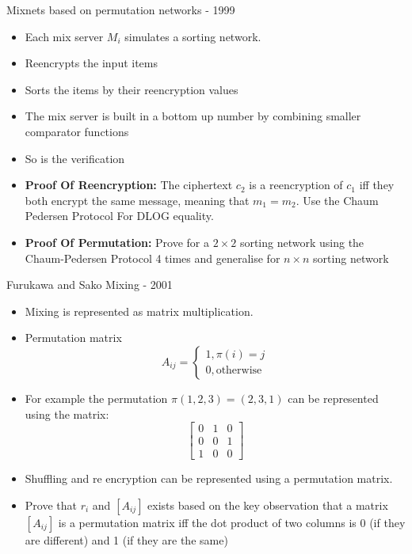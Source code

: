 \documentclass{beamer}
\begin{document}
\begin{frame}[allowframebreaks]{Mixnets based on permutation networks - 1999}
\begin{itemize}
\item Each mix server $M_i$ simulates a sorting network.
\item Reencrypts the input items
\item Sorts the items by their reencryption values
\item The mix server is built in a bottom up number by combining smaller comparator functions
\item So is the verification
\item \textbf{Proof Of Reencryption:} The ciphertext $c_2$ is a reencryption of $c_1$ iff they both encrypt the same message, meaning that $m_1=m_2$. Use the Chaum Pedersen Protocol For DLOG equality.
\item \textbf{Proof Of Permutation:} Prove for a $2 \times 2$  sorting network using the Chaum-Pedersen Protocol 4 times and generalise for $n \times n$ sorting network
\end{itemize}
\end{frame}

\begin{frame}[allowframebreaks]{Furukawa and Sako Mixing - 2001}
\begin{itemize}
\item Mixing is represented as matrix multiplication.
\item Permutation matrix
\[
A_{ij} = \begin{cases} 1, \pi(i)=j \\ 0, \text{otherwise} \end{cases}
\]
\item For example the permutation $\pi(1,2,3) = (2,3,1)$ can be represented using the matrix:
\[\begin{bmatrix}
  0 & 1 & 0 \\
  0 & 0 & 1 \\
  1 & 0 & 0
 \end{bmatrix}\]
\item Shuffling and re encryption can be represented using a permutation matrix.
\item Prove that $r_i$ and $[A_{ij}]$ exists based on the key observation that a matrix $[A_{ij}]$ is a permutation matrix iff the dot product of two columns is 0 (if they are different) and 1 (if they are the same)
\end{itemize}
\end{frame}
\end{document}
